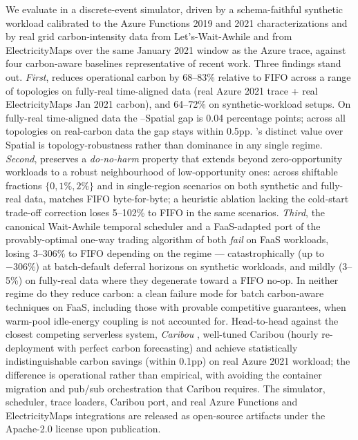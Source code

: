 We evaluate \GreenFaaS{} in a discrete-event simulator, driven by a
schema-faithful synthetic workload calibrated to the Azure Functions
2019 and 2021 characterizations and by real grid carbon-intensity
data from Let's-Wait-Awhile \citep{wiesner2021lets,lwa} and from
ElectricityMaps over the same January 2021 window as the Azure trace,
against four carbon-aware baselines representative of recent work.
Three findings stand out.
\emph{First}, \GreenFaaS{} reduces operational carbon by 68--83\% relative to FIFO across
a range of topologies on fully-real time-aligned data (real Azure
2021 trace + real ElectricityMaps Jan 2021 carbon), and 64--72\% on
synthetic-workload setups. On fully-real time-aligned data the
\GreenFaaS{}--Spatial gap is 0.04 percentage points; across all
topologies on real-carbon data the gap stays within 0.5pp.
\GreenFaaS's distinct value over Spatial is topology-robustness
rather than dominance in any single regime.
\emph{Second}, \GreenFaaS{} preserves a \emph{do-no-harm} property
that extends beyond zero-opportunity workloads to a robust
neighbourhood of low-opportunity ones: across shiftable fractions
$\{0, 1\%, 2\%\}$ and in single-region scenarios on both synthetic
and fully-real data, \GreenFaaS{} matches FIFO byte-for-byte; a
heuristic ablation lacking the cold-start trade-off correction loses
5--102\% to FIFO in the same scenarios.
\emph{Third}, the canonical Wait-Awhile temporal scheduler and a
FaaS-adapted port of the provably-optimal one-way trading algorithm
of \citet{lechowicz2024online} both \emph{fail} on FaaS workloads,
losing 3--306\% to FIFO depending on the regime --- catastrophically
(up to $-306\%$) at batch-default deferral horizons on synthetic
workloads, and mildly (3--5\%) on fully-real data where they
degenerate toward a FIFO no-op. In neither regime do they reduce carbon: a clean
failure mode for batch carbon-aware techniques on FaaS, including
those with provable competitive guarantees, when warm-pool
idle-energy coupling is not accounted for. Head-to-head against the closest competing
serverless system, \emph{Caribou} \citep{gsteiger2024caribou}, well-tuned
Caribou (hourly re-deployment with perfect carbon forecasting) and
\GreenFaaS{} achieve statistically indistinguishable carbon savings (within 0.1pp) on real Azure
2021 workload; the difference is operational rather than empirical,
with \GreenFaaS{} avoiding the container migration and pub/sub
orchestration that Caribou requires.
The simulator, scheduler, trace loaders, Caribou port, and
real Azure Functions and ElectricityMaps integrations are released as
open-source artifacts under the Apache-2.0 license upon publication.
